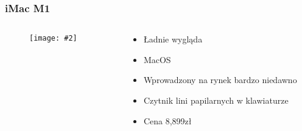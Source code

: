 \documentclass[aspectratio=169]{beamer}
\newcommand{\obrazek}[2]{
\begin{figure}[h]
    \centering
    \texttt{[image: \#2]}
\end{figure}
}
\begin{document}
\begin{frame}
    \frametitle{iMac M1}
    \begin{columns}
        \begin{column}{.5\textwidth}
            \obrazek{.15}{imac.jpg}
        \end{column}
        \begin{column}{.5\textwidth}
            \begin{itemize}
                \item Ładnie wygląda
                \item MacOS
                \item Wprowadzony na rynek bardzo niedawno
                \item Czytnik lini papilarnych w klawiaturze
                \item Cena 8,899zł
            \end{itemize}
        \end{column}
    \end{columns}
\end{frame}
\end{document}
